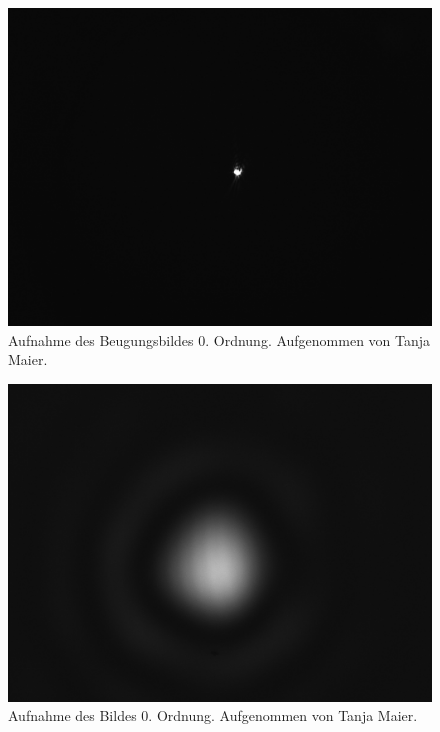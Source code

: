 \documentclass{article}
\begin{document}
 
\begin{minipage}[t]{.45\textwidth}
\begin{figure}[H]
\includegraphics[scale=0.1]{tm/Beugungsbild_0.jpg}
\caption{Aufnahme des Beugungsbildes 0. Ordnung. Aufgenommen von Tanja Maier.}
\label{fig:bbild_0_tm}
\end{figure}
\end{minipage}
\hfill
\noindent
\begin{minipage}[t]{.45\textwidth}
\begin{figure}[H]
\includegraphics[scale=0.1]{tm/Bild_0.jpg}
\caption{Aufnahme des Bildes 0. Ordnung. Aufgenommen von Tanja Maier.}\label{fig:bild_0_tm}
\end{figure}
\end{minipage}
\end{document}

